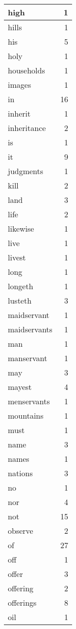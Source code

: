 \begin{center}
\begin{longtable}{l|r}
high & 1 \\ \hline
hills & 1 \\ \hline
his & 5 \\ \hline
holy & 1 \\ \hline
households & 1 \\ \hline
images & 1 \\ \hline
in & 16 \\ \hline
inherit & 1 \\ \hline
inheritance & 2 \\ \hline
is & 1 \\ \hline
it & 9 \\ \hline
judgments & 1 \\ \hline
kill & 2 \\ \hline
land & 3 \\ \hline
life & 2 \\ \hline
likewise & 1 \\ \hline
live & 1 \\ \hline
livest & 1 \\ \hline
long & 1 \\ \hline
longeth & 1 \\ \hline
lusteth & 3 \\ \hline
maidservant & 1 \\ \hline
maidservants & 1 \\ \hline
man & 1 \\ \hline
manservant & 1 \\ \hline
may & 3 \\ \hline
mayest & 4 \\ \hline
menservants & 1 \\ \hline
mountains & 1 \\ \hline
must & 1 \\ \hline
name & 3 \\ \hline
names & 1 \\ \hline
nations & 3 \\ \hline
no & 1 \\ \hline
nor & 4 \\ \hline
not & 15 \\ \hline
observe & 2 \\ \hline
of & 27 \\ \hline
off & 1 \\ \hline
offer & 3 \\ \hline
offering & 2 \\ \hline
offerings & 8 \\ \hline
oil & 1 \\ \hline

\end{longtable}
\end{center}
